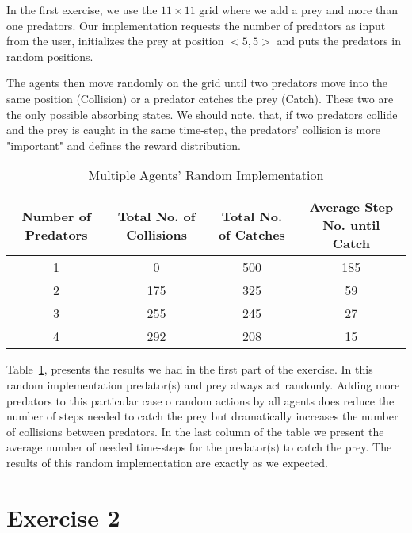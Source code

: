 \documentclass[a4paper,11pt]{article}
\begin{document}
In the first exercise, we use the $11 \times 11$ grid where we add a prey and more than one predators. Our implementation requests the number of predators as input from the user, initializes the prey at position $<5,5>$ and puts the predators in random positions. 

The agents then move randomly on the grid until two predators move into the same position (Collision) or a predator catches the prey (Catch). These two are the only possible absorbing states. We should note, that, if two predators collide and the prey is caught in the same time-step, the predators' collision is more "important" and defines the reward distribution.


\begin{table}[h]
\begin{center}
\caption{Multiple Agents' Random Implementation}
\begin{tabular}{c c c c} 
\hline\hline               
\textbf{\small{Number of Predators}} & \textbf{\small{Total No. of Collisions}} & \textbf{\small{Total No. of Catches}} & \textbf{\small{Average Step No. until Catch}} \\  
\hline
1 & 0 & 500 & 185\\ 
2 & 175 & 325  & 59\\
3 & 255 & 245   & 27\\
4 & 292 & 208 & 15 \\ 
\end{tabular}
\label{table:multirandom} 
\end{center} 
\end{table} 
\begin{center}

\end{center}

Table~\ref{table:multirandom}, presents the results we had in the first part of the exercise. In this random implementation predator(s) and prey always act randomly. Adding more predators to this particular case o random actions by all agents does reduce the number of steps needed to catch the prey but dramatically increases the number of collisions between predators. In the last column of the table we present the average number of needed time-steps for the predator(s) to catch the prey. The results of this random implementation are exactly as we expected.
 

\section{Exercise 2}
\end{document}
